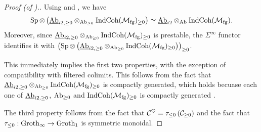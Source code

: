 \begin{proof}[Proof (of ).]
  Using  and \cite[Remark C.4.2.3]{SAG}, we have
  \[\operatorname{\mathrm{Sp}} \otimes \left(\underline{\mathrm{Ab}}_{i2, \geq 0} \otimes_{\mathrm{Ab}_{\geq 0}} \mathrm{IndCoh}(\mathcal{M}_{\mathrm{fg}})_{\geq 0} \right) \simeq \underline{\mathrm{Ab}}_{i2} \otimes_{\mathrm{Ab}} \mathrm{IndCoh}(\mathcal{M}_{\mathrm{fg}}).\]
  Moreover, since $\underline{\mathrm{Ab}}_{i2, \geq 0} \otimes_{\mathrm{Ab}_{\geq 0}} \mathrm{IndCoh}(\mathcal{M}_{\mathrm{fg}})_{\geq 0}$ is prestable, the $\Sigma^{\infty}$ functor identifies it with $\left(\operatorname{\mathrm{Sp}} \otimes \left(\underline{\mathrm{Ab}}_{i2, \geq 0} \otimes_{\mathrm{Ab}_{\geq 0}} \mathrm{IndCoh}(\mathcal{M}_{\mathrm{fg}})_{\geq 0} \right)\right)_{\geq 0}$.

  This immediately implies the first two properties, with the exception of compatibility with filtered colimits. This follows from the fact that $\underline{\mathrm{Ab}}_{i2, \geq 0} \otimes_{\mathrm{Ab}_{\geq 0}} \mathrm{IndCoh}(\mathcal{M}_{\mathrm{fg}})_{\geq 0}$ is compactly generated, which holds becuase each one of $\underline{\mathrm{Ab}}_{i2, \geq 0}$, $\mathrm{Ab}_{\geq 0}$ and $\mathrm{IndCoh}(\mathcal{M}_{\mathrm{fg}})_{\geq 0}$ is compactly generated \cite[Corollary C.6.2.3]{SAG}.

  The third property follows from the fact that $\mathcal{C}^{\heartsuit} = \tau_{\leq 0} \left( \mathcal{C}_{\geq 0} \right)$ and the fact that $\tau_{\leq 0}: \mathrm{Groth}_{\infty} \to \mathrm{Groth}_1$ is symmetric monoidal.
\end{proof}

%
%
%
%
%



